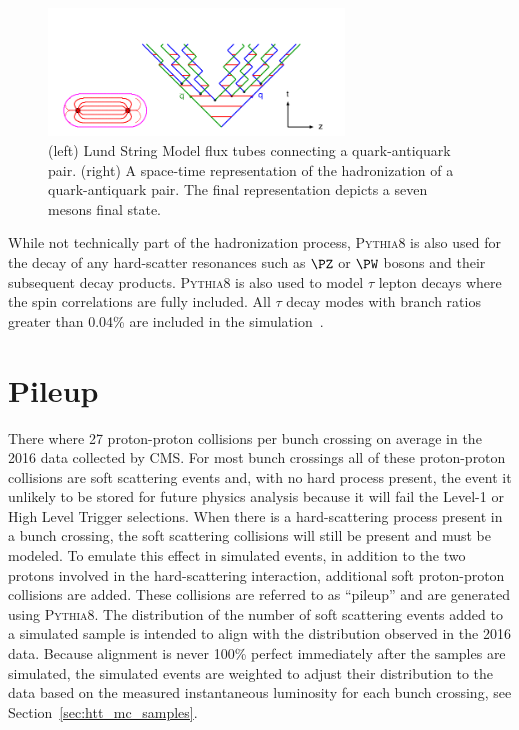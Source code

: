 \begin{figure}[htbp]
\centering
     \includegraphics[width=0.7\textwidth]{simulation/plots/lund_time-space.png}
     \caption{
(left) Lund String Model flux tubes connecting a quark-antiquark pair. (right) A
space-time representation of the hadronization of a quark-antiquark pair. 
The final representation depicts a seven mesons final state.
     }
     \label{fig:sim_lund_string}
\end{figure}

While not technically part of the hadronization process, \textsc{Pythia8} is also used for the 
decay of any hard-scatter resonances such as $\PZ$ or $\PW$ bosons and their subsequent
decay products. \textsc{Pythia8} is also used to model $\tau$ lepton decays where the spin
correlations are fully included. All $\tau$ decay modes with branch ratios greater than 0.04\%
are included in the simulation~\cite{ILTEN201477}.



\section{Pileup}
There where 27 proton-proton collisions per bunch crossing on average
in the 2016 data collected by CMS.
For most bunch crossings all of these proton-proton collisions are soft
scattering events and, with no hard process present, the event it unlikely to be stored for
future physics analysis because it will fail the Level-1 or High Level Trigger selections. 
When there is a hard-scattering process present in a bunch crossing,
the soft scattering collisions will still be present and must be modeled. 
To emulate this effect in simulated events, in addition to the two protons involved in the 
hard-scattering interaction, additional soft proton-proton collisions are added.
These collisions are referred to as ``pileup'' and are generated using
\textsc{Pythia8}. 
The distribution of the number of soft scattering events added to a simulated 
sample is intended to align with the distribution observed in the 2016 data.
Because alignment is never 100\% perfect immediately after the samples are simulated, the simulated events
are weighted to adjust their distribution to the data based on the measured instantaneous
luminosity for each bunch crossing, see Section~\ref{sec:htt_mc_samples}.




